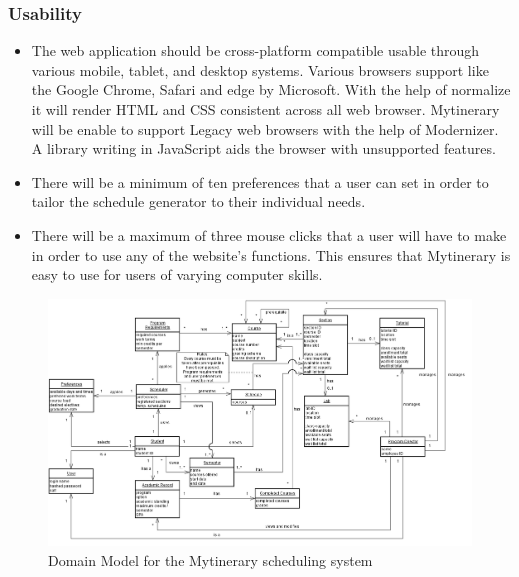 \documentclass[12pt]{article}
\begin{document}
\subsubsection*{Usability}
\begin{itemize}
    \item  The web application should be cross-platform compatible usable through various mobile, tablet, and desktop systems. Various browsers support like the Google Chrome, Safari and edge by Microsoft. With the help of normalize it will render HTML and CSS consistent across all web browser. Mytinerary will be enable to support Legacy web browsers with the help of Modernizer. A library writing in JavaScript aids the browser with unsupported features.
    \item There will be a minimum of ten preferences that a user can set in order to tailor the schedule generator to their individual needs.
    \item There will be a maximum of three mouse clicks that a user will have to make in order to use any of the website's functions. This ensures that Mytinerary is easy to use for users of varying computer skills.
\end{itemize}



\begin{figure}[H]
\centering
\includegraphics[width=1.4\textwidth, angle=-90]{domain_model}
\caption{Domain Model for the Mytinerary scheduling system}
\label{fig:domain_model}
\end{figure}



\vfill
\newpage
\end{document}
